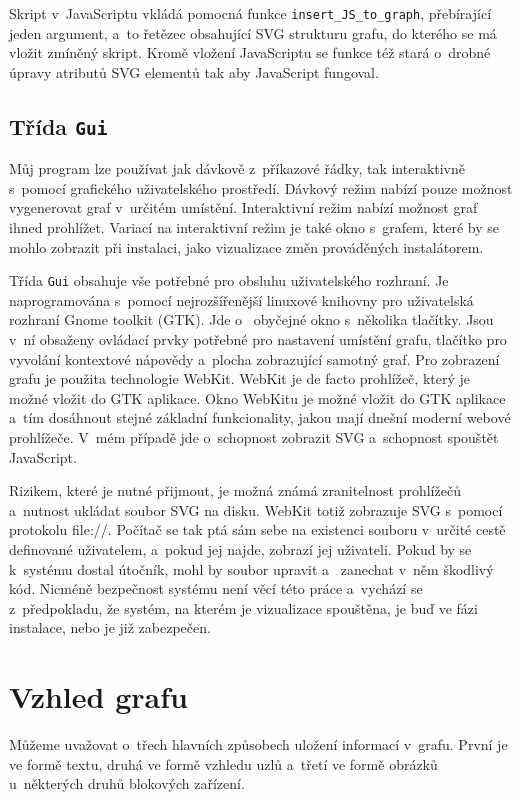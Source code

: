\documentclass[color,table,oneside,nolot,nolof]{fithesis}
\begin{document}
	Skript v~JavaScriptu vkládá pomocná funkce \texttt{insert\_JS\_to\_graph}, přebírající jeden argument, a~to řetězec obsahující SVG strukturu grafu, do kterého se má vložit zmíněný skript. 
	Kromě vložení JavaScriptu se funkce též stará o~drobné úpravy atributů SVG elementů tak aby JavaScript fungoval. 

\section{Třída \texttt{Gui}}
	Můj program lze používat jak dávkově z~příkazové řádky, tak interaktivně s~pomocí grafického uživatelského prostředí. Dávkový režim nabízí pouze možnost vygenerovat graf v~určitém 
	umístění. Interaktivní režim nabízí možnost graf ihned prohlížet. Variací na interaktivní režim je také okno s~grafem, které by se mohlo zobrazit při instalaci, jako vizualizace změn prováděných
	instalátorem. 

	Třída \texttt{Gui} obsahuje vše potřebné pro obsluhu uživatelského rozhraní. Je naprogramována s~pomocí nejrozšířenější linuxové knihovny pro uživatelská rozhraní Gnome toolkit (GTK). Jde o~
	obyčejné okno s~několika tlačítky. Jsou v~ní obsaženy ovládací prvky potřebné pro nastavení umístění grafu, tlačítko pro vyvolání kontextové
	nápovědy a~plocha zobrazující samotný graf. Pro zobrazení grafu je použita technologie WebKit. WebKit je de facto prohlížeč, který je možné vložit do GTK aplikace.
	Okno WebKitu je možné vložit do GTK aplikace a~tím dosáhnout stejné základní funkcionality,
	jakou mají dnešní moderní webové prohlížeče. V~mém případě jde o~schopnost zobrazit SVG a~schopnost spouštět JavaScript.

	Rizikem, které je nutné přijmout, je možná známá zranitelnost prohlížečů a~nutnost ukládat soubor SVG na disku. WebKit totiž zobrazuje SVG s~pomocí protokolu file://. Počítač se
	tak ptá sám sebe na existenci souboru v~určité cestě definované uživatelem, a~pokud jej najde, zobrazí jej uživateli. Pokud by se k~systému dostal útočník, mohl by soubor upravit a~
	zanechat v~něm škodlivý kód. Nicméně bezpečnost systému není věcí této práce a~vychází se z~předpokladu, že systém, na kterém je vizualizace spouštěna, je buď ve fázi instalace, nebo
	je již zabezpečen. 

\chapter{Vzhled grafu}
  Můžeme uvažovat o~třech hlavních způsobech uložení informací v~grafu. První je ve formě textu, druhá ve formě vzhledu uzlů a~třetí ve formě obrázků 
	u~některých druhů blokových zařízení. 
\end{document}
